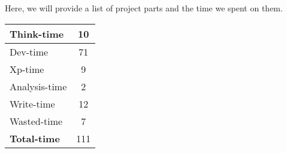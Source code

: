 Here, we will provide a list of project parts and the time we spent on them. \\

\begin{tabular}{| l | c |}
\hline
Think-time & 10 \\
\hline
Dev-time & 71 \\
\hline
Xp-time & 9 \\
\hline
Analysis-time & 2 \\
\hline
Write-time & 12 \\
\hline
Wasted-time & 7 \\
\hline \hline
\textbf{Total-time} & 111 \\
\hline
\end{tabular}